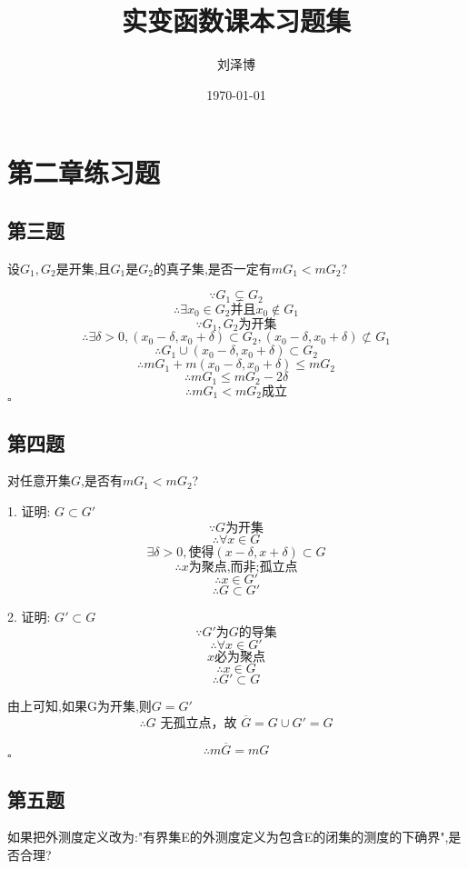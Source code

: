 \documentclass[a4paper]{article}
\title{实变函数课本习题集}
\author{刘泽博}
\date{\today}
\begin{document}
    \maketitle
    \tableofcontents
    \section{第二章练习题}
    \subsection{第三题}
    设$G_1,G_2$是开集,且$G_1$是$G_2$的真子集,是否一定有$mG_1<mG_2$?

        \[\because G_1 \subsetneq G_2\]
        \[\therefore \exists x_0 \in G_2 \text{并且}  x_0 \notin G_1\]
        \[\because G_1,G_2 \text{为开集}\]
        \[\therefore \exists \delta > 0,(x_0 - \delta,x_0 + \delta) \subset G_2,(x_0 - \delta,x_0 + \delta)\not\subset G_1\]
        \[\therefore G_1\cup(x_0 - \delta,x_0 + \delta) \subset G_2\]
        \[\therefore mG_1 + m(x_0 - \delta,x_0 + \delta) \leq mG_2\]
        \[\therefore mG_1 \leq mG_2 - 2\delta\]
        \[\therefore mG_1<mG_2 \text{成立}\]
    \hfill $\square$

    \subsection{第四题}
    对任意开集$G$,是否有$mG_1<mG_2$?

        1. 证明: $G \subset G'$
        \[\because G \text{为开集}\]
        \[\therefore \forall x \in G\]
        \[\exists \delta > 0,\text{使得}(x-\delta,x+\delta)\subset G\]
        \[\therefore x \text{为聚点,而非;孤立点}\]
        \[\therefore x \in G'\]
        \[\therefore G \subset G'\]

        2. 证明: $G' \subset G$
        \[\because G'\text{为} G \text{的导集}\]
        \[\therefore \forall x \in G'\]
        \[x \text{必为聚点}\]
        \[\therefore x \in G\]
        \[\therefore G' \subset G\]

        由上可知,如果G为开集,则$G = G'$
        \[\therefore G \text{ 无孤立点，故 } \overline{G} = G \cup G' = G\]

        \[\therefore m\overline{G}=mG\]
    \hfill $\square$

    \subsection{第五题}
    如果把外测度定义改为:"有界集E的外测度定义为包含E的闭集的测度的下确界",是否合理?
\end{document}
